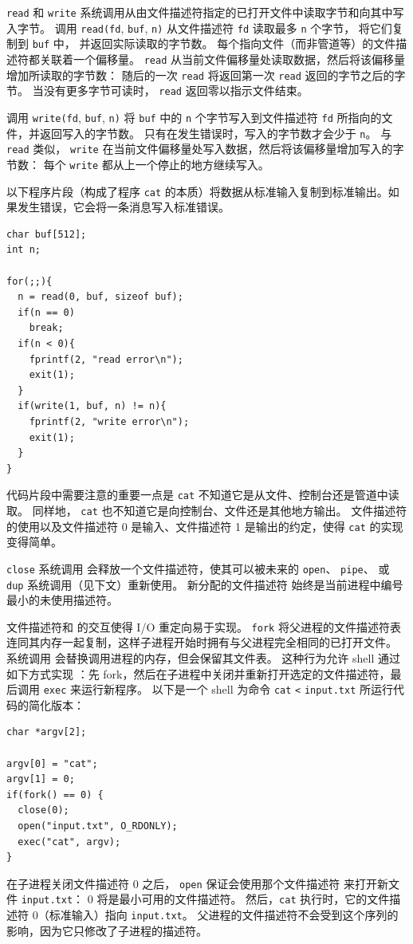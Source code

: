 \lstinline{read}
和
\lstinline{write}
系统调用从由文件描述符指定的已打开文件中读取字节和向其中写入字节。
调用
\lstinline{read(fd},
\lstinline{buf},
\lstinline{n)}
从文件描述符
\lstinline{fd}
读取最多
\lstinline{n}
个字节，
将它们复制到
\lstinline{buf}
中，
并返回实际读取的字节数。
每个指向文件（而非管道等）的文件描述符都关联着一个偏移量。
\lstinline{read}
从当前文件偏移量处读取数据，然后将该偏移量增加所读取的字节数：
随后的一次
\lstinline{read}
将返回第一次
\lstinline{read}
返回的字节之后的字节。
当没有更多字节可读时，
\lstinline{read}
返回零以指示文件结束。

调用
\lstinline{write(fd},
\lstinline{buf},
\lstinline{n)}
将
\lstinline{buf}
中的
\lstinline{n}
个字节写入到文件描述符
\lstinline{fd}
所指向的文件，并返回写入的字节数。
只有在发生错误时，写入的字节数才会少于
\lstinline{n}。
与
\lstinline{read}
类似，
\lstinline{write}
在当前文件偏移量处写入数据，然后将该偏移量增加写入的字节数：
每个
\lstinline{write}
都从上一个停止的地方继续写入。

以下程序片段（构成了程序
\lstinline{cat}
的本质）将数据从标准输入复制到标准输出。如果发生错误，它会将一条消息写入标准错误。
\begin{lstlisting}[]
char buf[512];
int n;

for(;;){
  n = read(0, buf, sizeof buf);
  if(n == 0)
    break;
  if(n < 0){
    fprintf(2, "read error\n");
    exit(1);
  }
  if(write(1, buf, n) != n){
    fprintf(2, "write error\n");
    exit(1);
  }
}
\end{lstlisting}
代码片段中需要注意的重要一点是
\lstinline{cat}
不知道它是从文件、控制台还是管道中读取。
同样地，
\lstinline{cat}
也不知道它是向控制台、文件还是其他地方输出。
文件描述符的使用以及文件描述符 0 是输入、文件描述符 1 是输出的约定，使得
\lstinline{cat}
的实现变得简单。

\lstinline{close}
系统调用
会释放一个文件描述符，使其可以被未来的
\lstinline{open}、
\lstinline{pipe}、
或
\lstinline{dup}
系统调用（见下文）重新使用。
新分配的文件描述符
始终是当前进程中编号最小的未使用描述符。

文件描述符和
的交互使得 I/O 重定向易于实现。
\lstinline{fork}
将父进程的文件描述符表连同其内存一起复制，这样子进程开始时拥有与父进程完全相同的已打开文件。
系统调用
会替换调用进程的内存，但会保留其文件表。
这种行为允许 shell 通过如下方式实现 ：先 fork，然后在子进程中关闭并重新打开选定的文件描述符，最后调用 \lstinline{exec} 来运行新程序。
以下是一个 shell 为命令
\lstinline{cat}
\lstinline{<}
\lstinline{input.txt} 所运行代码的简化版本：
\begin{lstlisting}[]
char *argv[2];

argv[0] = "cat";
argv[1] = 0;
if(fork() == 0) {
  close(0);
  open("input.txt", O_RDONLY);
  exec("cat", argv);
}
\end{lstlisting}
在子进程关闭文件描述符 0 之后，
\lstinline{open}
保证会使用那个文件描述符
来打开新文件
\lstinline{input.txt}：
0 将是最小可用的文件描述符。
然后，\lstinline{cat}
执行时，它的文件描述符 0（标准输入）指向
\lstinline{input.txt}。
父进程的文件描述符不会受到这个序列的影响，因为它只修改了子进程的描述符。

